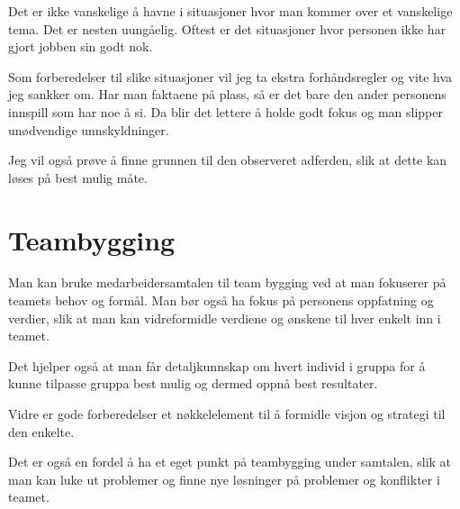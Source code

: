 \documentclass[12pt, a4paper]{article}
\begin{document}
Det er ikke vanskelige å havne i situasjoner hvor man kommer over et vanskelige
tema. Det er nesten uungåelig. Oftest er det situasjoner hvor personen ikke har
gjort jobben sin godt nok.   

Som forberedelser til slike situasjoner vil jeg ta ekstra forhåndsregler og
vite hva jeg sankker om. Har man faktaene på plass, så er det bare den ander
personens innspill som har noe å si. Da blir det lettere å holde godt fokus og
man slipper unødvendige unnskyldninger.

Jeg vil også prøve å finne grunnen til den observeret adferden, slik at dette
kan løses på best mulig måte. 

\section{Teambygging}
Man kan bruke medarbeidersamtalen til team bygging ved at man fokuserer på
teamets behov og formål. 
Man bør også ha fokus på personens oppfatning og verdier, slik at man kan
vidreformidle verdiene og ønskene til hver enkelt inn i teamet. 

Det hjelper også at man får detaljkunnskap om hvert individ i gruppa for å
kunne tilpasse gruppa best mulig og dermed oppnå best resultater. 

Vidre er gode forberedelser et nøkkelelement til å formidle visjon og strategi
til den enkelte. 

Det er også en fordel å ha et eget punkt på teambygging under samtalen, slik
at man kan luke ut problemer og finne nye løsninger på problemer og konflikter
i teamet.  
\end{document}
